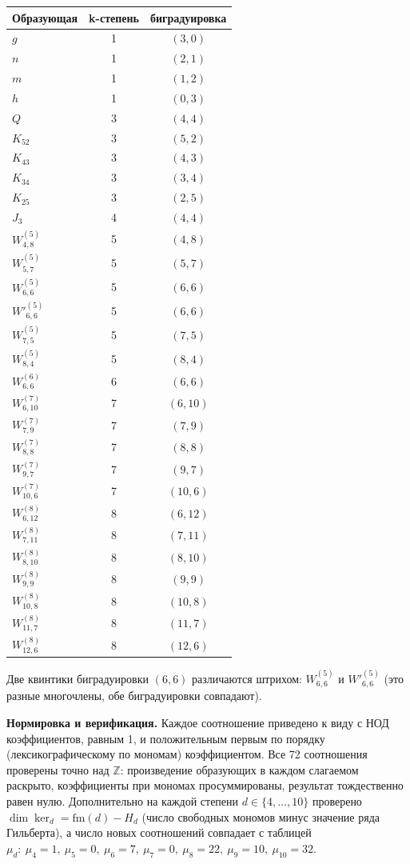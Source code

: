 \begin{center}
\begin{tabular}{lcc}
\hline
Образующая & k-степень & биградуировка \\
\hline
$g$ & 1 & $(3,0)$ \\
$n$ & 1 & $(2,1)$ \\
$m$ & 1 & $(1,2)$ \\
$h$ & 1 & $(0,3)$ \\
$Q$ & 3 & $(4,4)$ \\
$K_{52}$ & 3 & $(5,2)$ \\
$K_{43}$ & 3 & $(4,3)$ \\
$K_{34}$ & 3 & $(3,4)$ \\
$K_{25}$ & 3 & $(2,5)$ \\
$J_3$ & 4 & $(4,4)$ \\
$W^{(5)}_{4,8}$ & 5 & $(4,8)$ \\
$W^{(5)}_{5,7}$ & 5 & $(5,7)$ \\
$W^{(5)}_{6,6}$ & 5 & $(6,6)$ \\
$W'^{(5)}_{6,6}$ & 5 & $(6,6)$ \\
$W^{(5)}_{7,5}$ & 5 & $(7,5)$ \\
$W^{(5)}_{8,4}$ & 5 & $(8,4)$ \\
$W^{(6)}_{6,6}$ & 6 & $(6,6)$ \\
$W^{(7)}_{6,10}$ & 7 & $(6,10)$ \\
$W^{(7)}_{7,9}$ & 7 & $(7,9)$ \\
$W^{(7)}_{8,8}$ & 7 & $(8,8)$ \\
$W^{(7)}_{9,7}$ & 7 & $(9,7)$ \\
$W^{(7)}_{10,6}$ & 7 & $(10,6)$ \\
$W^{(8)}_{6,12}$ & 8 & $(6,12)$ \\
$W^{(8)}_{7,11}$ & 8 & $(7,11)$ \\
$W^{(8)}_{8,10}$ & 8 & $(8,10)$ \\
$W^{(8)}_{9,9}$ & 8 & $(9,9)$ \\
$W^{(8)}_{10,8}$ & 8 & $(10,8)$ \\
$W^{(8)}_{11,7}$ & 8 & $(11,7)$ \\
$W^{(8)}_{12,6}$ & 8 & $(12,6)$ \\
\hline
\end{tabular}
\end{center}

Две квинтики биградуировки $(6,6)$ различаются штрихом: $W^{(5)}_{6,6}$ и
$W'^{(5)}_{6,6}$ (это разные многочлены, обе биградуировки совпадают).

\medskip
\noindent\textbf{Нормировка и верификация.} Каждое соотношение приведено к
виду с НОД коэффициентов, равным 1, и положительным первым по порядку
(лексикографическому по мономам) коэффициентом. Все 72 соотношения проверены
точно над $\mathbb{Z}$: произведение образующих в каждом слагаемом раскрыто,
коэффициенты при мономах просуммированы, результат тождественно равен нулю.
Дополнительно на каждой степени $d \in \{4,\dots,10\}$ проверено
$\dim\ker_d = \mathrm{fm}(d) - H_d$ (число свободных мономов минус значение
ряда Гильберта), а число новых соотношений совпадает с таблицей
$\mu_d\colon\ \mu_4=1,\ \mu_5=0,\ \mu_6=7,\ \mu_7=0,\ \mu_8=22,\ \mu_9=10,\ \mu_10=32$.

